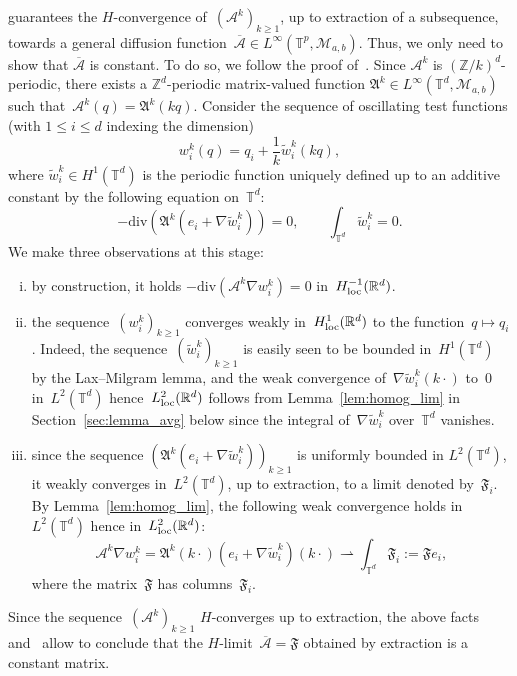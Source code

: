 \documentclass{article}
\newcommand{\R}{\mathbb{R}}
\renewcommand{\leq}{\leqslant}
\renewcommand{\geq}{\geqslant}
\def\R{\mathbb{R}}
\def\T{\mathbb{T}}
\newcommand{\A}{\mathcal{A}}
\renewcommand{\dim}{d}
\begin{document}
 guarantees the $H$-convergence of~$(\A^k)_{k\geq 1}$, up to extraction of a subsequence, towards a general diffusion function~$\overline{\A}\in L^\infty(\mathbb{T}^p,\mathcal{M}_{a,b})$. Thus, we only need to show that $\overline{\A}$ is constant. To do so, we follow the proof of~\cite[Theorem~1.3.18]{allaire_homogeneisation}. Since $\A^k$ is $(\mathbb{Z}/k)^\dim$-periodic, there exists a $\mathbb{Z}^\dim$-periodic matrix-valued function $\mathfrak{A}^k \in L^\infty(\mathbb{T}^\dim,\mathcal{M}_{a,b})$ such that~$\A^k(q) = \mathfrak{A}^k(kq)$. Consider the sequence of oscillating test functions (with $1 \leq i \leq \dim$ indexing the dimension)
\[
w_i^k(q) = q_i + \frac1k \widetilde{w}_i^k(kq), 
\]
where $\widetilde{w}_i^k \in H^1(\T^\dim)$ is the periodic function uniquely defined up to an additive constant by the following equation on~$\mathbb{T}^\dim$:
\[
-\mathrm{div}\left(\mathfrak{A}^k (e_i + \nabla \widetilde{w}_i^k)\right) = 0, \qquad \int_{\T^\dim} \widetilde{w}_i^k = 0.
\]
We make three observations at this stage:
\begin{enumerate}[(i)]
\item by construction, it holds $-\mathrm{div}\left(\A^k \nabla w_i^k \right) = 0$ in~$H^{-1}_{\rm loc}(\R^\dim)$. 
\item the sequence~$(w_i^k)_{k \geq 1}$ converges weakly in~$H^1_{\rm loc}(\R^\dim)$ to the function~$q \mapsto q_i$. Indeed, the sequence~$(\widetilde{w}_i^k)_{k \geq 1}$ is easily seen to be bounded in~$H^1(\T^\dim)$ by the Lax--Milgram lemma, and the weak convergence of~$\nabla \widetilde{w}_i^k(k \cdot)$ to~0 in~$L^2(\T^\dim)$ hence~$L^2_{\rm loc}(\R^\dim)$ follows from Lemma~\ref{lem:homog_lim} in Section~\ref{sec:lemma_avg} below since the integral of~$\nabla \widetilde{w}_i^k$ over~$\T^\dim$ vanishes.
\item since the sequence $(\mathfrak{A}^k (e_i+\nabla \widetilde{w}_i^k))_{k \geq 1}$ is uniformly bounded in $L^2(\mathbb{T}^\dim)$, it weakly converges in~$L^2(\mathbb{T}^\dim)$, up to extraction, to a limit denoted by~$\mathfrak{F}_i$. By Lemma~\ref{lem:homog_lim}, the following weak convergence holds in~$L^2(\T^\dim)$ hence in~$L^2_{\rm loc}(\R^\dim)$:
\[
\A^k \nabla w_i^k = \mathfrak{A}^k(k \cdot) \left(e_i+\nabla \widetilde{w}_i^k\right)(k \cdot) \rightharpoonup \int_{\T^\dim} \mathfrak{F}_i := \mathfrak{F} e_i,
\]
where the matrix~$\mathfrak{F}$ has columns~$\mathfrak{F}_i$.
\end{enumerate}
Since the sequence~$(\A^k)_{k \geq 1}$ $H$-converges up to extraction, the above facts and~\cite[Proposition~1.2.19]{allaire_homogeneisation} allow to conclude that the $H$-limit~$\overline{\A} = \mathfrak{F}$ obtained by extraction is a constant matrix.
\end{document}
